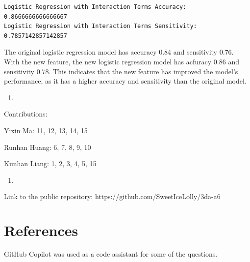 \documentclass[
  11pt,
  letterpaper,
  DIV=11,
  numbers=noendperiod]{scrartcl}
\providecommand{\tightlist}{%
  \setlength{\itemsep}{0pt}\setlength{\parskip}{0pt}}\usepackage{longtable,booktabs,array}
\begin{document}
\begin{verbatim}
Logistic Regression with Interaction Terms Accuracy:  0.8666666666666667
Logistic Regression with Interaction Terms Sensitivity:  0.7857142857142857
\end{verbatim}

The original logistic regression model has accuracy 0.84 and sensitivity
0.76. With the new feature, the new logistic regression model has
acfuracy 0.86 and sensitivity 0.78. This indicates that the new feature
has improved the model's performance, as it has a higher accuracy and
sensitivity than the original model.

\begin{enumerate}
\def\labelenumi{(\arabic{enumi})}
\setcounter{enumi}{15}
\tightlist
\item
\end{enumerate}

Contributions:

Yixin Ma: 11, 12, 13, 14, 15

Runhan Huang: 6, 7, 8, 9, 10

Kunhan Liang: 1, 2, 3, 4, 5, 15

\begin{enumerate}
\def\labelenumi{(\arabic{enumi})}
\setcounter{enumi}{16}
\tightlist
\item
\end{enumerate}

Link to the public repository: https://github.com/SweetIceLolly/3da-a6

\newpage

\section{References}\label{references}

GitHub Copilot was used as a code assistant for some of the questions.
\end{document}
